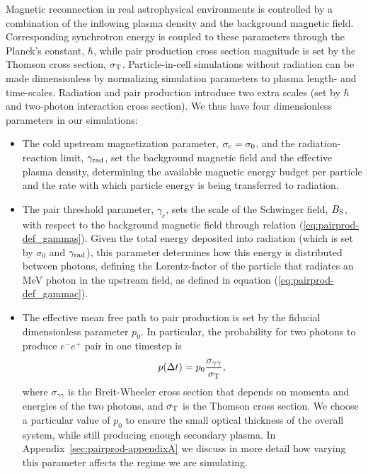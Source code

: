 Magnetic reconnection in real astrophysical environments is controlled by a combination of the inflowing plasma density and the background magnetic field. Corresponding synchrotron energy is coupled to these parameters through the Planck's constant, $\hbar$, while pair production cross section magnitude is set by the Thomson cross section, $\sigma_{\rm T}$. Particle-in-cell simulations without radiation can be made dimensionless by normalizing simulation parameters to plasma length- and time-scales. Radiation and pair production introduce two extra scales (set by $\hbar$ and two-photon interaction cross section). We thus have four dimensionless parameters in our simulations:
\begin{itemize}

    \item The cold upstream magnetization parameter, $\sigma_{\rm c} = \sigma_0$, and the radiation-reaction limit, $\gamma_{\rm rad}$, set the background magnetic field and the effective plasma density, determining the available magnetic energy budget per particle and the rate with which particle energy is being transferred to radiation.

    \item The pair threshold parameter, $\gamma_c$, sets the scale of the Schwinger field, $B_{\rm S}$, with respect to the background magnetic field through relation (\ref{eq:pairprod-def_gammas}). Given the total energy deposited into radiation (which is set by $\sigma_0$ and $\gamma_{\rm rad}$), this parameter determines how this energy is distributed between photons, defining the Lorentz-factor of the particle that radiates an MeV photon in the upstream field, as defined in equation (\ref{eq:pairprod-def_gammac}).

    \item The effective mean free path to pair production is set by the fiducial dimensionless parameter $p_0$. In particular, the probability for two photons to produce $e^-e^+$ pair in one timestep is
    \begin{equation}
        p(\Delta t)=p_0\frac{\sigma_{\gamma\gamma}}{\sigma_{\rm T}},
    \end{equation}
    where $\sigma_{\gamma\gamma}$ is the Breit-Wheeler cross section that depends on momenta and energies of the two photons, and $\sigma_{\rm T}$ is the Thomson cross section. We choose a particular value of $p_0$ to ensure the small optical thickness of the overall system, while still producing enough secondary plasma. In Appendix~\ref{sec:pairprod-appendixA} we discuss in more detail how varying this parameter affects the regime we are simulating. 
\end{itemize}

